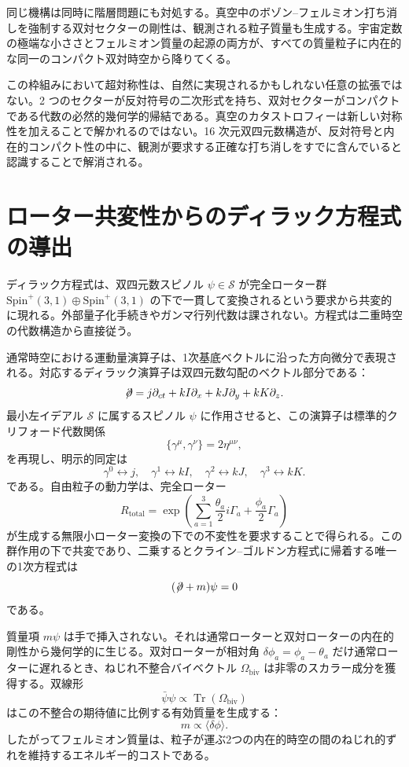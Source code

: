 \documentclass[a4paper]{article}
\begin{document}
同じ機構は同時に階層問題にも対処する。真空中のボゾン--フェルミオン打ち消しを強制する双対セクターの剛性は、観測される粒子質量も生成する。宇宙定数の極端な小ささとフェルミオン質量の起源の両方が、すべての質量粒子に内在的な同一のコンパクト双対時空から降りてくる。

この枠組みにおいて超対称性は、自然に実現されるかもしれない任意の拡張ではない。2 つのセクターが反対符号の二次形式を持ち、双対セクターがコンパクトである代数の必然的幾何学的帰結である。真空のカタストロフィーは新しい対称性を加えることで解かれるのではない。16 次元双四元数構造が、反対符号と内在的コンパクト性の中に、観測が要求する正確な打ち消しをすでに含んでいると認識することで解消される。

\section{ローター共変性からのディラック方程式の導出}
\label{sec:dirac}

ディラック方程式は、双四元数スピノル $\psi \in \mathcal{S}$ が完全ローター群 $\mathrm{Spin}^+(3,1) \oplus \mathrm{Spin}^+(3,1)$ の下で一貫して変換されるという要求から共変的に現れる。外部量子化手続きやガンマ行列代数は課されない。方程式は二重時空の代数構造から直接従う。

通常時空における運動量演算子は、1次基底ベクトルに沿った方向微分で表現される。対応するディラック演算子は双四元数勾配のベクトル部分である：
\[
\not\!\partial = j \partial_{ct} + kI \partial_x + kJ \partial_y + kK \partial_z.
\]
最小左イデアル $\mathcal{S}$ に属するスピノル $\psi$ に作用させると、この演算子は標準的クリフォード代数関係
\[
\{\gamma^\mu, \gamma^\nu\} = 2\eta^{\mu\nu},
\]
を再現し、明示的同定は
\[
\gamma^0 \leftrightarrow j, \quad \gamma^1 \leftrightarrow kI, \quad \gamma^2 \leftrightarrow kJ, \quad \gamma^3 \leftrightarrow kK.
\]
である。自由粒子の動力学は、完全ローター
\[
R_\text{total} = \exp\left( \sum_{a=1}^3 \frac{\theta_a}{2} i\Gamma_a + \frac{\phi_a}{2} \Gamma_a \right)
\]
が生成する無限小ローター変換の下での不変性を要求することで得られる。この群作用の下で共変であり、二乗するとクライン--ゴルドン方程式に帰着する唯一の1次方程式は
\[
(\not\!\partial + m)\psi = 0
\]
である。

質量項 $m\psi$ は手で挿入されない。それは通常ローターと双対ローターの内在的剛性から幾何学的に生じる。双対ローターが相対角 $\delta\phi_a = \phi_a - \theta_a$ だけ通常ローターに遅れるとき、ねじれ不整合バイベクトル $\Omega_\text{biv}$ は非零のスカラー成分を獲得する。双線形
\[
\bar{\psi}\psi \propto \operatorname{Tr}(\Omega_\text{biv})
\]
はこの不整合の期待値に比例する有効質量を生成する：
\[
m \propto \langle \delta\phi \rangle.
\]
したがってフェルミオン質量は、粒子が運ぶ2つの内在的時空の間のねじれ的ずれを維持するエネルギー的コストである。
\end{document}
